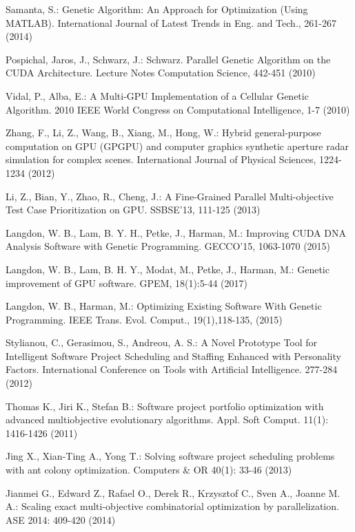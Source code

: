 \begin{thebibliography}{}
Samanta, S.:
Genetic Algorithm: An Approach for Optimization (Using MATLAB). 
International Journal of Latest Trends in Eng. and Tech., 261-267 (2014)


Pospichal, Jaros, J., Schwarz, J.:
Schwarz. Parallel Genetic Algorithm on the CUDA Architecture.
Lecture Notes Computation Science, 442-451 (2010)

Vidal, P., Alba, E.:
A Multi-GPU Implementation of a Cellular Genetic Algorithm.
2010 IEEE World Congress on Computational Intelligence, 1-7 (2010)

Zhang, F., Li, Z., Wang, B., Xiang, M., Hong, W.:
Hybrid general-purpose computation on GPU (GPGPU) and computer graphics synthetic aperture radar simulation for complex scenes.
International Journal of Physical Sciences, 1224-1234 (2012)

Li, Z., Bian, Y., Zhao, R., Cheng, J.:
A Fine-Grained Parallel Multi-objective Test Case Prioritization on GPU.
SSBSE'13, 111-125 (2013)

Langdon, W. B., Lam, B. Y. H., Petke, J., Harman, M.:
Improving CUDA DNA Analysis Software with Genetic Programming.
GECCO'15, 1063-1070 (2015)

Langdon, W. B., Lam, B. H. Y., Modat, M., Petke, J., Harman, M.:
Genetic improvement of GPU software.
GPEM, 18(1):5-44 (2017)

Langdon, W. B., Harman, M.:
Optimizing Existing Software With Genetic Programming.
IEEE Trans. Evol. Comput., 19(1),118-135, (2015)

Stylianou, C., Gerasimou, S., Andreou, A. S.:
A Novel Prototype Tool for Intelligent Software
Project Scheduling and Staffing Enhanced with Personality Factors.
International Conference on Tools with Artificial Intelligence. 277-284 (2012)

Thomas K., Jiri K., Stefan B.:
Software project portfolio optimization with advanced multiobjective evolutionary algorithms.
Appl. Soft Comput. 11(1): 1416-1426 (2011)

Jing X., Xian-Ting A., Yong T.:
Solving software project scheduling problems with ant colony optimization.
Computers \& OR 40(1): 33-46 (2013)

Jianmei G., Edward Z., Rafael O., Derek R., Krzysztof C., Sven A., Joanne M. A.:
Scaling exact multi-objective combinatorial optimization by parallelization.
ASE 2014: 409-420 (2014)



\end{thebibliography}
